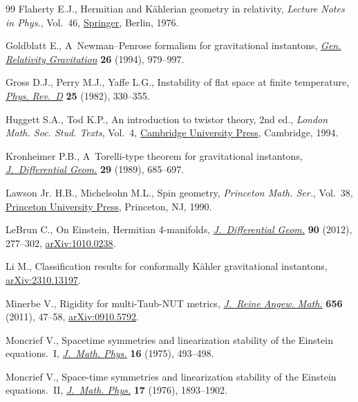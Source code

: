 \documentclass[pdftex]{sigma}
\numberwithin{equation}{section}
\begin{document}
\begin{thebibliography}{99}
Flaherty E.J., Hermitian and {K}\"ahlerian geometry in relativity,
 \textit{Lecture Notes in Phys.}, Vol.~46, \href{https://doi.org/10.1007/3-540-07540-2}{Springer}, Berlin, 1976.

Goldblatt E., A~{N}ewman--{P}enrose formalism for gravitational instantons,
 \href{https://doi.org/10.1007/BF02106666}{\textit{Gen. Relativity Gravitation}} \textbf{26} (1994), 979--997.

Gross D.J., Perry M.J., Yaffe L.G., Instability of flat space at finite
 temperature, \href{https://doi.org/10.1103/PhysRevD.25.330}{\textit{Phys. Rev.~D}} \textbf{25} (1982), 330--355.

Huggett S.A., Tod K.P., An introduction to twistor theory, 2nd ed., \textit{London Math.
 Soc. Stud. Texts}, Vol.~4, \href{https://doi.org/10.1017/CBO9780511624018}{Cambridge University Press}, Cambridge,
 1994.

Kronheimer P.B., A~{T}orelli-type theorem for gravitational instantons,
 \href{https://doi.org/10.4310/jdg/1214443067}{\textit{J.~Differential Geom.}} \textbf{29} (1989), 685--697.

Lawson Jr. H.B., Michelsohn M.L., Spin geometry, \textit{Princeton Math. Ser.},
 Vol.~38, \href{https://doi.org/10.1515/9781400883912}{Princeton University Press}, Princeton, NJ, 1990.

LeBrun C., On {E}instein, {H}ermitian 4-manifolds, \href{https://doi.org/10.4310/jdg/1335230848}{\textit{J.~Differential
 Geom.}} \textbf{90} (2012), 277--302, \href{https://arxiv.org/abs/1010.0238}{arXiv:1010.0238}.

Li M., Classification results for conformally {K}\"ahler gravitational
 instantons, \href{https://arxiv.org/abs/2310.13197}{arXiv:2310.13197}.

Minerbe V., Rigidity for multi-{T}aub-{NUT} metrics, \href{https://doi.org/10.1515/CRELLE.2011.042}{\textit{J.~Reine Angew.
 Math.}} \textbf{656} (2011), 47--58, \href{https://arxiv.org/abs/0910.5792}{arXiv:0910.5792}.

Moncrief V., Spacetime symmetries and linearization stability of the {E}instein
 equations.~{I}, \href{https://doi.org/10.1063/1.522572}{\textit{J.~Math. Phys.}} \textbf{16} (1975), 493--498.

Moncrief V., Space-time symmetries and linearization stability of the
 {E}instein equations.~{II}, \href{https://doi.org/10.1063/1.522814}{\textit{J.~Math. Phys.}} \textbf{17} (1976),
 1893--1902.


\end{thebibliography}
\end{document}
